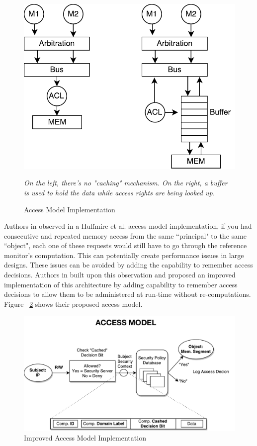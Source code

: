 \documentclass[sigconf]{acmart}
\theoremstyle{plain}
\theoremstyle{remark}
\begin{document}
\begin{figure}[hbt]
\centering
\includegraphics[width=0.75\columnwidth]{figures/ted_access.pdf}
\caption{Access Model Implementation}
\textit{On the left, there's no "caching" mechanism. On the right, a buffer is used to hold the data while access rights are being looked up.} %
\label{fig:ted}
\end{figure}

Authors in \cite{FestusFCCM} observed in a Huffmire et al. access model implementation, if you had consecutive and repeated memory access from the same ``principal" to the same ``object", each one of these requests would still have to go through the reference monitor's computation. This can potentially create performance issues in large designs. These issues can be avoided by adding the capability to remember access decisions. Authors in \cite{FestusFCCM} built upon this observation and proposed an improved implementation of this architecture by adding capability to remember access decisions to allow them to be administered at run-time without re-computations. Figure ~\ref{fig:access} shows their proposed access model.

\begin{figure}[hbt]
\centering
\includegraphics[width=1\columnwidth]{figures/access.pdf}
\caption{Improved Access Model Implementation} %
\label{fig:access}
\end{figure}
\end{document}
